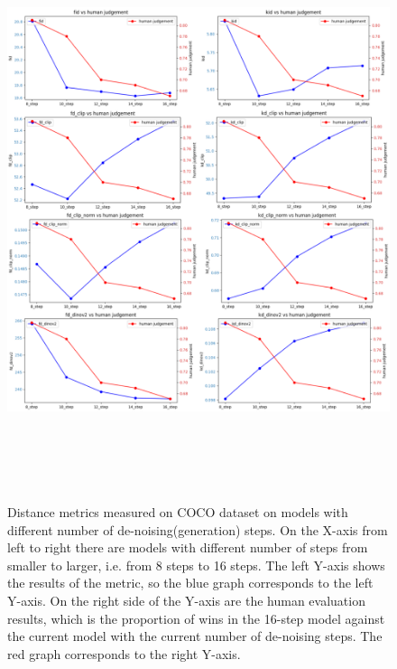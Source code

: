 \begin{figure}[]
\centering
\includegraphics[width=16cm, height=17cm]{figs/coco_gen_steps.png}
\caption{Distance metrics measured on COCO dataset on models with different number of de-noising(generation) steps. On the X-axis from left to right there are models with different number of steps from smaller to larger, i.e. from 8 steps to 16 steps. The left Y-axis shows the results of the metric, so the blue graph corresponds to the left Y-axis. On the right side of the Y-axis are the human evaluation results, which is the proportion of wins in the 16-step model against the current model with the current number of de-noising steps. The red graph corresponds to the right Y-axis.}
\label{fig:coco_gen_steps}
\end{figure}

